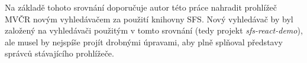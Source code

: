 Na základě tohoto srovnání doporučuje autor této práce nahradit prohlížeč MVČR novým vyhledávačem za použití knihovny SFS. 
Nový vyhledávač by byl založený na vyhledávači použitým v tomto srovnání (tedy projekt {\em sfs-react-demo}), ale musel by nejspíše projít drobnými úpravami, aby plně splňoval představy správců stávajícího prohlížeče.
